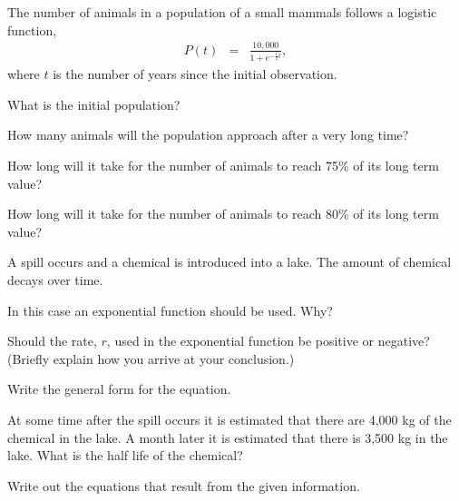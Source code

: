 \begin{problem}
\item The number of animals in a population of a small mammals follows
  a logistic function,
  \begin{eqnarray*}
    P(t) & = & \frac{10,000}{1+e^{-\frac{1}{2}t}},
  \end{eqnarray*}
  where $t$ is the number of years since the initial observation.
  \begin{subproblem}
  \item What is the initial population?
    \vspace{4em}
  \item How many animals will the population approach after a very
    long time?
    \vspace{4em}
  \item How long will it take for the number of animals to reach 75\%
    of its long term value?
    \vfill
  \item How long will it take for the number of animals to reach 80\%
    of its long term value?
    \vfill
  \end{subproblem}

\clearpage

\item A spill occurs and a chemical is introduced into a lake. The
  amount of chemical decays over time. 
  \begin{subproblem}
  \item In this case an exponential function should be used. Why?
    \vspace{2em}

  \item Should the rate, $r$, used in the exponential function be
    positive or negative? (Briefly explain how you arrive at your
    conclusion.)  
    \vspace{2em}

  \item Write the general form for the equation.
    \vspace{2em}

  \item At some time after the spill occurs it is estimated that there
    are 4,000 kg of the chemical in the lake. A month later it is
    estimated that there is 3,500 kg in the lake. What is the half
    life of the chemical?
    \begin{subsubproblem}
    \item Write out the equations that result from the given information.
      \vspace{2em}


\end{subsubproblem}
\end{subproblem}
\end{problem}
